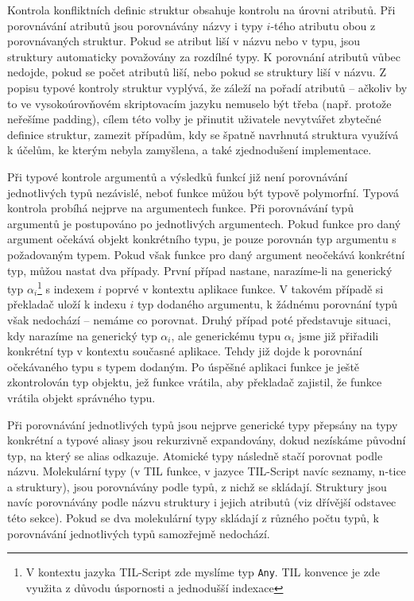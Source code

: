 Kontrola konfliktních definic struktur obsahuje kontrolu na úrovni atributů. Při porovnávání
atributů jsou porovnávány názvy i typy $i$-tého atributu obou z porovnávaných struktur. Pokud se
atribut liší v názvu nebo v typu, jsou struktury automaticky považovány za rozdílné typy.
K porovnání atributů vůbec nedojde, pokud se počet atributů liší, nebo pokud se struktury liší
v názvu. Z popisu typové kontroly struktur vyplývá, že záleží na pořadí atributů -- ačkoliv by to
ve vysokoúrovňovém skriptovacím jazyku nemuselo být třeba (např. protože neřešíme padding), cílem
této volby je přinutit uživatele nevytvářet zbytečné definice struktur, zamezit případům, kdy
se špatně navrhnutá struktura využívá k účelům, ke kterým nebyla zamyšlena, a také zjednodušení
implementace.

Při typové kontrole argumentů a výsledků funkcí již není porovnávání jednotlivých typů nezávislé,
neboť funkce můžou být typově polymorfní. Typová kontrola probíhá nejprve na argumentech funkce.
Při porovnávání typů argumentů je postupováno po jednotlivých argumentech. Pokud funkce pro daný
argument očekává objekt konkrétního typu, je pouze porovnán typ argumentu s požadovaným typem.
Pokud však funkce pro daný argument neočekává konkrétní typ, můžou nastat dva případy. První případ
nastane, narazíme-li na generický typ $\alpha_{i}$\footnote{V kontextu jazyka TIL-Script zde myslíme typ
  \lstinline{Any}. TIL konvence je zde využita z důvodu úspornosti a jednodušší
  indexace} s indexem $i$ poprvé v kontextu aplikace funkce. V takovém případě si překladač uloží
k indexu $i$ typ dodaného argumentu, k žádnému porovnání typů však nedochází -- nemáme co porovnat.
Druhý případ poté představuje situaci, kdy narazíme na generický typ $\alpha_{i}$, ale generickému typu
$\alpha_{i}$ jsme již přiřadili konkrétní typ v kontextu současné aplikace. Tehdy již dojde k porovnání
očekávaného typu s typem dodaným. Po úspěšné aplikaci funkce je ještě zkontrolován typ objektu, jež
funkce vrátila, aby překladač zajistil, že funkce vrátila objekt správného typu.

Při porovnávání jednotlivých typů jsou nejprve generické typy přepsány na typy konkrétní a typové
aliasy jsou rekurzivně expandovány, dokud nezískáme původní typ, na který se alias odkazuje.
Atomické typy následně stačí porovnat podle názvu. Molekulární typy (v TIL funkce, v jazyce
TIL-Script navíc seznamy, n-tice a struktury), jsou porovnávány podle typů, z nichž se skládají.
Struktury jsou navíc porovnávány podle názvu struktury i jejich atributů (viz dřívější odstavec této
sekce). Pokud se dva molekulární typy skládají z různého počtu typů, k porovnávání jednotlivých typů
samozřejmě nedochází.

